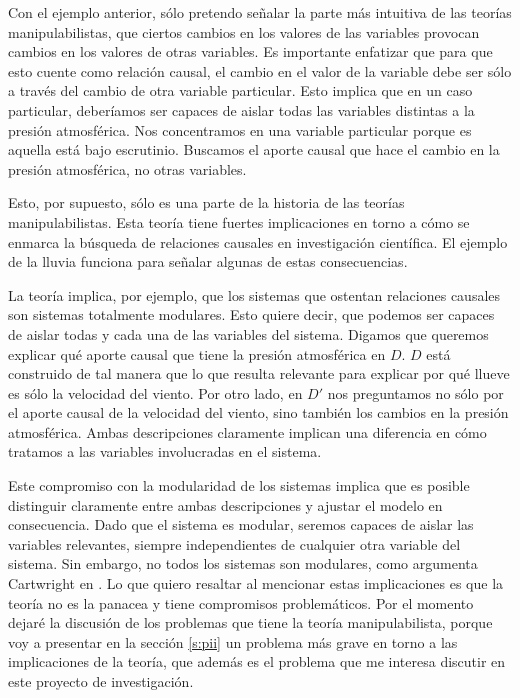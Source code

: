 Con el ejemplo anterior, sólo pretendo señalar la parte más
intuitiva de las teorías manipulabilistas, que ciertos
cambios en los valores de las variables provocan cambios en
los valores de otras variables. Es importante enfatizar que
para que esto cuente como relación causal, el cambio en el
valor de la variable debe ser sólo a través del cambio de
otra variable
particular. Esto implica que en un caso particular,
deberíamos ser capaces de aislar todas las variables
distintas a la presión atmosférica. Nos concentramos en una
variable particular porque es aquella está bajo escrutinio.
Buscamos el aporte causal que hace el cambio en la presión atmosférica, no otras
variables. 

Esto, por supuesto, sólo es una parte de la historia de las
teorías manipulabilistas. Esta teoría tiene fuertes
implicaciones en torno a cómo se enmarca la búsqueda de
relaciones causales en investigación científica. El ejemplo
de la lluvia funciona para señalar algunas de estas
consecuencias. 

La teoría implica, por ejemplo, que los sistemas que
ostentan relaciones causales son sistemas totalmente modulares. Esto
quiere decir, que podemos ser capaces de
aislar todas y cada una de las variables del sistema. Digamos que queremos explicar qué aporte causal que tiene la
presión atmosférica en $D$. $D$ está construido de tal
manera que lo que resulta relevante para explicar por qué
llueve es sólo la velocidad del viento. Por otro lado, en $D'$ nos preguntamos
no sólo por el aporte causal de la
velocidad del viento, sino también los cambios en la presión
atmosférica. Ambas descripciones claramente
implican una diferencia en cómo tratamos a las variables
involucradas en el sistema.

Este compromiso con la modularidad de los sistemas implica
que es posible distinguir claramente entre ambas descripciones y ajustar el modelo en consecuencia. Dado que el sistema es
modular, seremos capaces de aislar las variables relevantes, siempre
independientes de cualquier otra variable del sistema. Sin
embargo, no todos los sistemas son modulares, como argumenta Cartwright en \parencite{Cartwright2002}. Lo
que quiero resaltar al mencionar estas implicaciones es que
la teoría no es la panacea y tiene compromisos
problemáticos. Por el momento dejaré la discusión de los problemas que tiene
la teoría manipulabilista, porque voy a presentar en la sección \ref{s:pii}
un problema más grave en torno a las implicaciones de la
teoría, que además es el problema que me interesa discutir en este proyecto de
investigación. 

